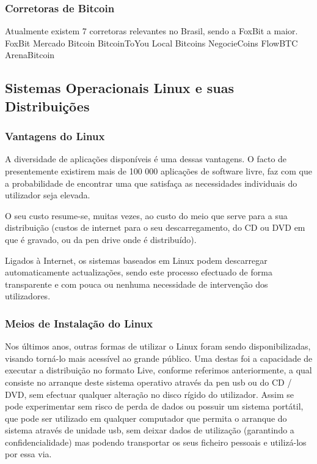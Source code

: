 \documentclass[
	article,			%
	12pt,				%
	openright,			%
	oneside,			%
	a4paper,			%
	chapter=TITLE,		%
	section=TITLE,		%
	subsection=TITLE,	%
	subsubsection=TITLE,%
	subsubsubsection=TITLE, %
	english,			%
	brazil,				%
	]{abntex2}
\begin{document}
\cite{Prado2017}

\subsubsection{Corretoras de Bitcoin}

Atualmente existem 7 corretoras relevantes no Brasil, sendo a FoxBit a maior.
FoxBit Mercado Bitcoin BitcoinToYou Local Bitcoins NegocieCoins FlowBTC ArenaBitcoin

\cite{Prado2017}

\subsection{Sistemas Operacionais Linux e suas Distribuições}

\subsubsection{Vantagens do Linux}

A diversidade de aplicações disponíveis é uma dessas vantagens. O facto de presentemente existirem mais de 100 000 aplicações de software livre, faz com que a probabilidade de encontrar uma que satisfaça as necessidades individuais do utilizador seja elevada.

O seu custo resume-se, muitas vezes, ao custo do meio que serve para a sua distribuição (custos de internet para o seu descarregamento, do CD ou DVD em que é gravado, ou da pen drive onde é distribuído).

Ligados à Internet, os sistemas baseados em Linux podem descarregar automaticamente actualizações, sendo este processo efectuado de forma transparente e com pouca ou nenhuma necessidade de intervenção dos utilizadores.

\cite{Nunes2009}

\subsubsection{Meios de Instalação do Linux}

Nos últimos anos, outras formas de utilizar o Linux foram sendo disponibilizadas, visando torná-lo mais acessível ao grande público. Uma destas foi a capacidade de executar a distribuição no formato Live, conforme referimos anteriormente, a qual consiste no arranque deste sistema operativo através da pen usb ou do CD / DVD, sem efectuar qualquer alteração no disco rígido do utilizador. Assim se pode experimentar sem risco de perda de dados ou possuir um sistema portátil, que pode ser utilizado em qualquer computador que permita o arranque do sistema através de unidade usb, sem deixar dados de utilização (garantindo a confidencialidade) mas podendo transportar os seus ficheiro pessoais e utilizá-los por essa via.
\end{document}
